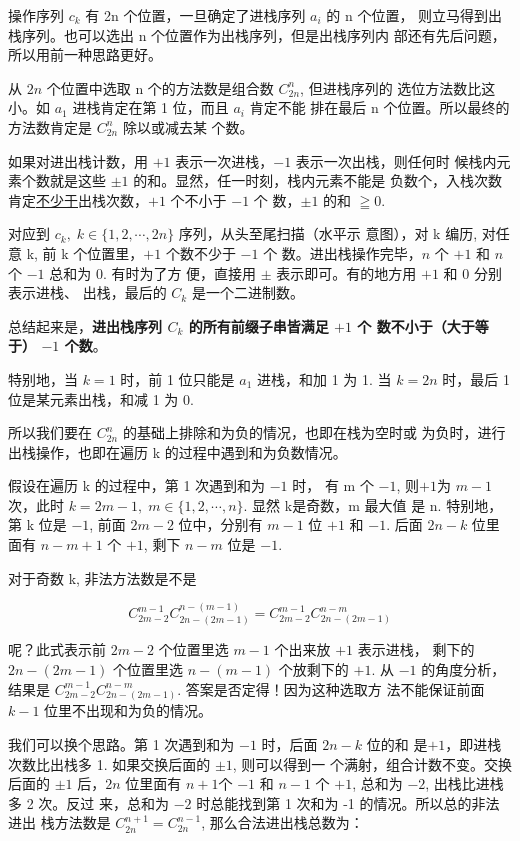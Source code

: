 操作序列 $c_k$ 有 2n 个位置，一旦确定了进栈序列 $a_i$ 的 n 个位置，
则立马得到出栈序列。也可以选出 n 个位置作为出栈序列，但是出栈序列内
部还有先后问题，所以用前一种思路更好。

从 $2n$ 个位置中选取 n 个的方法数是组合数 $C_{2n}^n$, 但进栈序列的
选位方法数比这小。如 $a_1$ 进栈肯定在第 1 位，而且 $a_i$ 肯定不能
排在最后 n 个位置。所以最终的方法数肯定是 $C_{2n}^n$ 除以或减去某
个数。

如果对进出栈计数，用 $+1$ 表示一次进栈，$-1$ 表示一次出栈，则任何时
候栈内元素个数就是这些 $\pm 1$ 的和。显然，任一时刻，栈内元素不能是
负数个，入栈次数肯定\uline{不少于}出栈次数，$+1$ 个不小于 $-1$ 个
数，$\pm 1$ 的和 $\geqq 0$.

对应到 $c_k,\; k \in \{1,2,\cdots,2n\}$ 序列，从头至尾扫描（水平示
意图），对 k 编历, 对任意 k, 前 k 个位置里，$+1$ 个数不少于 $-1$ 个
数。进出栈操作完毕，$n$ 个 $+1$ 和 $n$ 个 $-1$ 总和为 0. 有时为了方
便，直接用 $\pm$ 表示即可。有的地方用 $+1$ 和 $0$ 分别表示进栈、
出栈，最后的 $C_k$ 是一个二进制数。

总结起来是，\textbf{进出栈序列 $C_k$ 的所有前缀子串皆满足 $+1$ 个
  数不小于（大于等于） $-1$ 个数}。

特别地，当 $k = 1$ 时，前 1 位只能是 $a_1$ 进栈，和加 1 为 1. 当 $k
= 2n$ 时，最后 1 位是某元素出栈，和减 1 为 0.

所以我们要在 $C_{2n}^n$ 的基础上排除和为负的情况，也即在栈为空时或
为负时，进行出栈操作，也即在遍历 k 的过程中遇到和为负数情况。

假设在遍历 k 的过程中，第 1 次遇到和为 $-1$ 时，
有 m 个 $-1$, 则$+1$为 $m - 1$ 次，此时
$k = 2m - 1,\; m \in \{1,2,\cdots,n\}$. 显然 k是奇数，m 最大值
是 n. 特别地，第 k 位是 $-1$, 前面 $2m - 2$ 位中，分别有 $m -
1$ 位 $+1$ 和 $-1$. 后面 $2n-k$ 位里面有 $n - m +
1$ 个 $+1$, 剩下 $n - m$ 位是 $-1$.

对于奇数 k, 非法方法数是不是

\[
  C_{2m-2}^{m-1}C_{2n-(2m-1)}^{n-(m-1)} =
  C_{2m-2}^{m-1}C_{2n-(2m-1)}^{n-m}
\]

呢？此式表示前 $2m - 2$ 个位置里选 $m - 1$ 个出来放 $+1$ 表示进栈，
剩下的 $2n - (2m - 1)$ 个位置里选 $n - (m - 1)$ 个放剩下的
$+1$. 从 $-1$ 的角度分析，结果是
$C_{2m-2}^{m-1}C_{2n-(2m-1)}^{n-m}$. 答案是否定得！因为这种选取方
法不能保证前面 $k - 1$ 位里不出现和为负的情况。

我们可以换个思路。第 1 次遇到和为 $-1$ 时，后面 $2n-k$ 位的和
是$+1$，即进栈次数比出栈多 1. 如果交换后面的 $\pm 1$, 则可以得到一
个满射，组合计数不变。交换后面的 $\pm 1$ 后，$2n$ 位里面有 $n +
1$个 $-1$ 和 $n - 1$ 个 $+1$, 总和为 $-2$, 出栈比进栈多 2 次。反过
来，总和为 $-2$ 时总能找到第 1 次和为 -1 的情况。所以总的非法进出
栈方法数是 $C_{2n}^{n+1} = C_{2n}^{n-1}$, 那么合法进出栈总数为：

